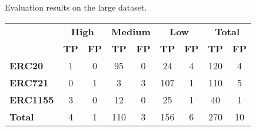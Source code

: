 \begin{table}[t]
\centering
\small

{Evaluation results on the large dataset.}
{
}
{
\begin{tabular}{|l|c|c|c|c|c|c||c|c|}
\hline
                 &  \multicolumn{2}{c|}{\textbf{High}} & \multicolumn{2}{c|}{\textbf{Medium}} & \multicolumn{2}{c||}{\textbf{Low}}  & \multicolumn{2}{c|}{{\textbf{Total}}} \\ 

\cline{2-3}
\cline{4-5}
\cline{6-7}
\cline{8-9}

 & {{\textbf{TP}}} &  {{\textbf{FP}}}  & {{\textbf{TP}}} &  {{\textbf{FP}}}  & {{\textbf{TP}}} &  {{\textbf{FP}}} & {{\textbf{TP}}} &  {{\textbf{FP}}} \\

\hline
\hline

{\textbf{ERC20}}     & 1 & 0 & 95 & 0  & 24  & 4   & 120  & 4    \\ \hline
{\textbf{ERC721}}    & 0 & 1 & 3  & 3  & 107 & 1   & 110 & 5  \\ \hline
{\textbf{ERC1155}}   & 3 & 0 & 12 & 0  & 25  & 1   & 40  & 1 \\ \hline \hline
{\textbf{Total}}     & 4 & 1 & 110 & 3  & 156 & 6   & 270 & 10 \\ \hline

\end{tabular}
}

\end{table}